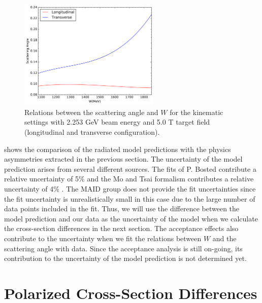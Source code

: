 \begin{figure}[tb!]
  \centering
  \includegraphics[width=0.6\textwidth]{figs/scattering-angle.pdf}
  \caption[Relations between the scattering angle and $W$.]{Relations between the scattering angle and $W$ for the kinematic settings with 2.253 GeV beam energy and 5.0 T target field (longitudinal and transverse configuration). \label{C8S2F7}}
\end{figure}

 shows the comparison of the radiated model predictions with the physics asymmetries extracted in the previous section. The uncertainty of the model prediction arises from several different sources. The fits of P. Bosted contribute a relative uncertainty of 5\% \cite{Bosted2008} and the Mo and Tsai formalism contributes a relative uncertainty of 4\% \cite{Mo1969}. The MAID group does not provide the fit uncertainties since the fit uncertainty is unrealistically small in this case due to the large number of data points included in the fit. Thus, we will use the difference between the model prediction and our data as the uncertainty of the model when we calculate the cross-section differences in the next section. The acceptance effects also contribute to the uncertainty when we fit the relations between $W$ and the scattering angle with data. Since the acceptance analysis is still on-going, its contribution to the uncertainty of the model prediction is not determined yet.

\section{Polarized Cross-Section Differences}
\label{C8S3}

